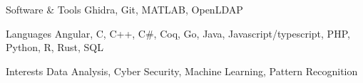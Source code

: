 
\begin{cvskills}
  \cvskill
    {Software \& Tools}
    {Ghidra, Git, MATLAB, OpenLDAP}

  \cvskill
    {Languages}
    {Angular, C, C++, C\#, Coq, Go, Java, Javascript/typescript, PHP, Python, R, Rust, SQL}

  \cvskill
    {Interests}
    {Data Analysis, Cyber Security, Machine Learning, Pattern Recognition}
\end{cvskills}
